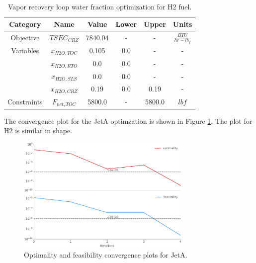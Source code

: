 \documentclass[12pt]{article}
\begin{document}
\begin{table}[H]
    \centering
    \caption{Vapor recovery loop water fraction optimization for H2 fuel.}
    \begin{tabular}{|c|c|c|c|c|c|}
        \hline
        Category    & Name          & Value   & Lower & Upper  & Units                 \\
        \hline
        Objective   & $TSEC_{CRZ}$  & 7840.04 & -     & -      & $\frac{BTU}{hr-lb_f}$ \\
        \hline
        Variables   & $x_{H2O,TOC}$ & 0.105   & 0.0   & -      & -                     \\
                    & $x_{H2O,RTO}$ & 0.0     & 0.0   & -      & -                     \\
                    & $x_{H2O,SLS}$ & 0.0     & 0.0   & -      & -                     \\
                    & $x_{H2O,CRZ}$ & 0.19    & 0.0   & 0.19   & -                     \\
        \hline
        Constraints & $F_{net,TOC}$ & 5800.0  & -     & 5800.0 & $lbf$                 \\
        \hline
    \end{tabular}
    \label{tab_h2_opt}
\end{table}

\noindent
The convergence plot for the JetA optimzation is shown in Figure \ref{fig:conv_opt}. The plot for H2 is similar in shape.

\begin{figure}[!hbt]
    \centering
    \includegraphics[width=0.75\textwidth]{opt_summary.pdf}
    \caption{Optimality and feasibility convergence plots for JetA.}
    \label{fig:conv_opt}
\end{figure}
\end{document}
